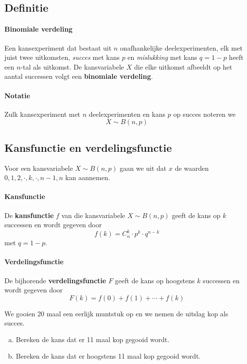 \documentclass[12pt,twoside]{article}
\begin{document}
\subsection{Definitie}

\paragraph*{Binomiale verdeling}
\begin{mdframed}
Een kansexperiment dat bestaat uit $n$ onafhankelijke deelexperimenten, elk met juist twee uitkomsten, {\em succes} met kans $p$ en {\em mislukking} met kans $q=1-p$ heeft een $n$-tal als uitkomst. De kansvariabele $X$ die elke uitkomst afbeeldt op het aantal successen volgt een {\bf binomiale verdeling}.
\end{mdframed}

\paragraph*{Notatie} Zulk kansexperiment met $n$ deelexperimenten en kans $p$ op succes noteren we
$$X \sim B(n, p)$$

\subsection{Kansfunctie en verdelingsfunctie}


Voor een kansvariabele $X \sim B(n, p)$ gaan we uit dat $x$ de waarden $0, 1, 2, \cdot, k, \cdot, n-1, n$ kan aannemen.

\paragraph*{Kansfunctie}
\begin{mdframed}
De {\bf kansfunctie} $f$ van die kansvariabele $X \sim B(n, p)$ geeft de kans op $k$ successen en wordt gegeven door
$$ f(k)=C_n^k\cdot p^k\cdot q^{n-k}$$
met $q=1-p$.
\end{mdframed}

\paragraph*{Verdelingsfunctie}
\begin{mdframed}
De bijhorende {\bf verdelingsfunctie} $F$ geeft de kans op hoogstens $k$ successen en wordt gegeven door
$$ F(k)=f(0) + f(1) + \cdots + f(k)$$
\end{mdframed}

\begin{oefening}
We gooien 20 maal een eerlijk muntstuk op en we nemen de uitslag kop als succes.
\begin{enumerate}[(a)]
  \item Bereken de kans dat er 11 maal kop gegooid wordt.
  \item Bereken de kans dat er hoogstens 11 maal kop gegooid wordt.
\end{enumerate}
\end{oefening}
\end{document}
